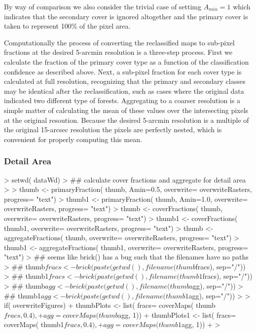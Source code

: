 By way of comparison we also consider the trivial case of settimg
$A_{min} = 1$ which indicates that the secondary cover is ignored
altogether and the primary cover is taken to represent 100\% of the
pixel area.

Computationally the process of converting the reclassified maps to
sub-pixel fractions at the desired 5-arcmin resolution is a three-step
process.  First we calculate the fraction of the primary cover type as
a function of the classification confidence as described above.  Next,
a sub-pixel fraction for each cover type is calculated at full
resolution, recognizing that the primary and secondary classes may be
identical after the reclassification, such as cases where the original
data indicated two different type of forests.  Aggregating to a
coarser resolution is a simple matter of calculating the mean of these
values over the intersecting pixels at the original resoution.
Because the desired 5-arcmin resolution is a multiple of the original
15-arcsec resolution the pixels are perfectly nested, which is
convenient for properly computing this mean.

\subsubsection{Detail Area}
\label{sec:agg-detail-area}

\begin{Schunk}
\begin{Sinput}
> setwd( dataWd)
> ## calculate cover fractions and aggregate for detail area
> 
> thumb  <- primaryFraction( thumb, Amin=0.5, overwrite= overwriteRasters, progress= "text")
> thumb1 <- primaryFraction( thumb, Amin=1.0, overwrite= overwriteRasters, progress= "text")
> thumb  <- coverFractions( thumb, overwrite= overwriteRasters, progress= "text")
> thumb1 <- coverFractions( thumb1, overwrite= overwriteRasters, progress= "text")
> thumb  <- aggregateFractions( thumb, overwrite= overwriteRasters, progress= "text")
> thumb1 <- aggregateFractions( thumb1, overwrite= overwriteRasters, progress= "text")
> ## seems like brick() has a bug such that the filenames have no paths
> ## thumb$fracs <- brick( paste( getwd(), filename( thumb$fracs), sep="/"))
> ## thumb1$fracs <- brick( paste( getwd(), filename( thumb1$fracs), sep="/"))
> ## thumb$agg <- brick( paste( getwd(), filename( thumb$agg), sep="/"))
> ## thumb1$agg <- brick( paste( getwd(), filename( thumb1$agg), sep="/"))
> 
> if( overwriteFigures) {
+   thumbPlots <- list( fracs= coverMaps( thumb$fracs, 0.4),
+                      agg= coverMaps( thumb$agg, 1))
+   thumbPlots1 <- list( fracs= coverMaps( thumb1$fracs, 0.4),
+                       agg= coverMaps( thumb1$agg, 1))
+ }
> 
\end{Sinput}
\end{Schunk}

